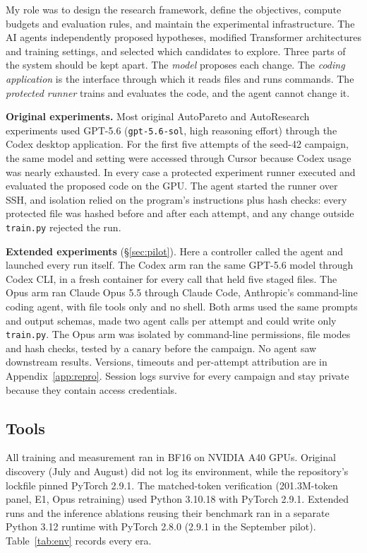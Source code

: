 \documentclass{article}
\newif\ifshowhumanmarkers \showhumanmarkersfalse
\newcommand{\humantag}[1]{{\color{humanframe}\sffamily\scriptsize\bfseries HUMAN AUTHOR MUST REWRITE/VERIFY [#1]}\ }
\newcommand{\humanauthor}[2][]{\ifshowhumanmarkers\begin{humanbox}\humantag{#1}#2\end{humanbox}\else #2\par\fi}
\begin{document}
\humanauthor[P2-02 r6]{My role was to design the research framework, define the objectives, compute budgets and evaluation rules, and maintain the experimental infrastructure. The AI agents independently proposed hypotheses, modified Transformer architectures and training settings, and selected which candidates to explore. Three parts of the system should be kept apart. The \emph{model} proposes each change. The \emph{coding application} is the interface through which it reads files and runs commands. The \emph{protected runner} trains and evaluates the code, and the agent cannot change it.

\textbf{Original experiments.} Most original AutoPareto and AutoResearch experiments used GPT-5.6 (\texttt{gpt-5.6-sol}, high reasoning effort) through the Codex desktop application. For the first five attempts of the seed-42 campaign, the same model and setting were accessed through Cursor because Codex usage was nearly exhausted. In every case a protected experiment runner executed and evaluated the proposed code on the GPU. The agent started the runner over SSH, and isolation relied on the program's instructions plus hash checks: every protected file was hashed before and after each attempt, and any change outside \texttt{train.py} rejected the run.

\textbf{Extended experiments} (\S\ref{sec:pilot}). Here a controller called the agent and launched every run itself. The Codex arm ran the same GPT-5.6 model through Codex CLI, in a fresh container for every call that held five staged files. The Opus arm ran Claude Opus 5.5 through Claude Code, Anthropic's command-line coding agent, with file tools only and no shell. Both arms used the same prompts and output schemas, made two agent calls per attempt and could write only \texttt{train.py}. The Opus arm was isolated by command-line permissions, file modes and hash checks, tested by a canary before the campaign. No agent saw downstream results. Versions, timeouts and per-attempt attribution are in Appendix~\ref{app:repro}. Session logs survive for every campaign and stay private because they contain access credentials.}

\subsection{Tools}
\humanauthor[P2-03 r6]{All training and measurement ran in BF16 on NVIDIA A40 GPUs. Original discovery (July and August) did not log its environment, while the repository's lockfile pinned PyTorch 2.9.1. The matched-token verification (201.3M-token panel, E1, Opus retraining) used Python 3.10.18 with PyTorch 2.9.1. Extended runs and the inference ablations reusing their benchmark ran in a separate Python 3.12 runtime with PyTorch 2.8.0 (2.9.1 in the September pilot). Table~\ref{tab:env} records every era.}
\end{document}
